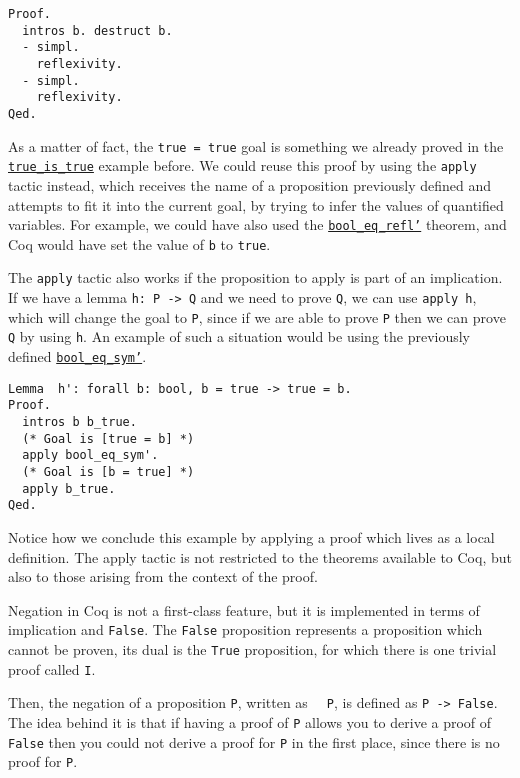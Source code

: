 \begin{verbatim}
Proof.
  intros b. destruct b.
  - simpl.
    reflexivity.
  - simpl.
    reflexivity. 
Qed.
\end{verbatim}

As a matter of fact, the \texttt{true = true} goal is something we already proved in the
\hyperref[lst:true-is-true]{\texttt{true_is_true}} example before. We could reuse this proof
by using the \texttt{apply} tactic instead, which receives the name of a proposition previously
defined and attempts to fit it into the current goal, by trying to infer the values of quantified 
variables. For example, we could have also used the 
\hyperref[lst:bool-eq-refl]{\texttt{bool_eq_refl'}} theorem, and Coq would have set the value of
\texttt{b} to \texttt{true}.

The \texttt{apply} tactic also works if the proposition to apply is part of an implication.
If we have a lemma \texttt{h: P -> Q} and we need to prove \texttt{Q}, we can use
\texttt{apply h}, which will change the goal to \texttt{P}, since if we are able to
prove \texttt{P} then we can prove \texttt{Q} by using \texttt{h}. An example
of such a situation would be using the previously defined 
\hyperref[lst:bool-eq-sym]{\texttt{bool_eq_sym'}}.

\begin{verbatim}
Lemma  h': forall b: bool, b = true -> true = b.
Proof.
  intros b b_true.
  (* Goal is [true = b] *)
  apply bool_eq_sym'.
  (* Goal is [b = true] *)
  apply b_true.
Qed.
\end{verbatim}

Notice how we conclude this example by applying a proof which lives as a local definition. The apply 
tactic is not restricted to the theorems available to Coq, but also to those arising from the context
of the proof.

Negation in Coq is not a first-class feature, but it is implemented in terms of implication and 
\texttt{False}. The \texttt{False} proposition represents a proposition which cannot be
proven, its dual is the \texttt{True} proposition, for which there is one trivial proof called
\texttt{I}.

Then, the negation of a proposition \texttt{P}, written as \texttt{~ P}, is defined as
\texttt{P -> False}. The idea behind it is that if having a proof of \texttt{P} allows
you to derive a proof of \texttt{False} then you could not derive a proof for \texttt{P}
in the first place, since there is no proof for \texttt{P}.

